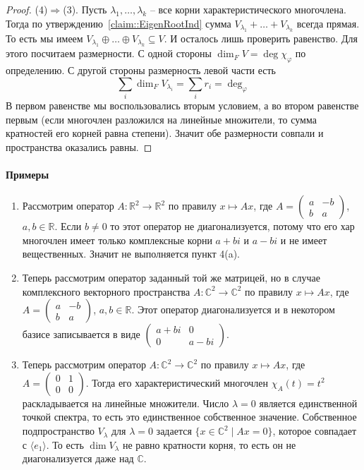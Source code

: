 \begin{proof}
(4)$\Rightarrow$(3).
Пусть $\lambda_1,\ldots,\lambda_k$ -- все корни характеристического многочлена.
Тогда по утверждению~\ref{claim::EigenRootInd} сумма $V_{\lambda_1}+\ldots +V_{\lambda_k}$ всегда прямая.
То есть мы имеем $V_{\lambda_1}\oplus \ldots \oplus V_{\lambda_k}\subseteq V$.
И осталось лишь проверить равенство.
Для этого посчитаем размерности.
С одной стороны $\dim_F V = \deg \chi_\varphi$ по определению.
С другой стороны размерность левой части есть
\[
\sum_{i}\dim_F V_{\lambda_i} = \sum_i r_i = \deg_\varphi
\]
В первом равенстве мы воспользовались вторым условием, а во втором равенстве первым (если многочлен разложился на линейные множители, то сумма кратностей его корней равна степени).
Значит обе размерности совпали и пространства оказались равны.
\end{proof}

\paragraph{Примеры}
\begin{enumerate}
\item Рассмотрим оператор $A\colon \mathbb R^2 \to \mathbb R^2$ по правилу $x\mapsto Ax$, где $A =\left( \begin{smallmatrix}{a}&{-b}\\{b}&{a}\end{smallmatrix}\right)$, $a, b\in\mathbb R$.
Если $b\neq 0$ то этот оператор не диагонализуется, потому что его хар многочлен имеет только комплексные корни $a+bi$ и $a - bi$ и не имеет вещественных.
Значит не выполняется пункт 4(a).

\item Теперь рассмотрим оператор заданный той же матрицей, но в случае комплексного векторного пространства $A\colon \mathbb C^2 \to \mathbb C^2$ по правилу $x\mapsto Ax$, где $A =\left( \begin{smallmatrix}{a}&{-b}\\{b}&{a}\end{smallmatrix}\right)$, $a, b\in\mathbb R$.
Этот оператор диагонализуется и в некотором базисе записывается в виде $\left( \begin{smallmatrix}{a + bi}&{0}\\{0}&{a-bi}\end{smallmatrix}\right)$.

\item Теперь рассмотрим оператор $A\colon \mathbb C^2 \to \mathbb C^2$ по правилу $x\mapsto Ax$, где $A =\left( \begin{smallmatrix}{0}&{1}\\{0}&{0}\end{smallmatrix}\right)$.
Тогда его характеристический многочлен $\chi_A(t) = t^2$ раскладывается на линейные множители.
Число $\lambda = 0$ является единственной точкой спектра, то есть это единственное собственное значение.
Собственное подпространство $V_\lambda$ для $\lambda = 0$ задается $\{x\in \mathbb C^2\mid Ax = 0\}$, которое совпадает с $\langle e_1 \rangle$.
То есть $\dim V_\lambda$ не равно кратности корня, то есть он не диагонализуется даже над $\mathbb C$.
\end{enumerate}

